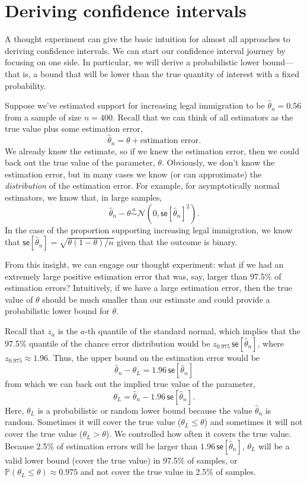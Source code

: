 \documentclass[
  13pt,
  letterpaper,
  DIV=11,
  numbers=noendperiod]{scrreprt}
\newcommand{\N}{\mathcal{N}}
\newcommand{\se}{\textsf{se}}
\renewcommand{\P}{\mathbb{P}}
\theoremstyle{plain}
\theoremstyle{plain}
\theoremstyle{definition}
\theoremstyle{definition}
\theoremstyle{remark}
\begin{document}
\section{Deriving confidence intervals}\label{sec-deriving-cis}

A thought experiment can give the basic intuition for almost all
approaches to deriving confidence intervals. We can start our confidence
interval journey by focusing on one side. In particular, we will derive
a probabilistic lower bound---that is, a bound that will be lower than
the true quantity of interest with a fixed probability.

Suppose we've estimated support for increasing legal immigration to be
\(\widehat{\theta}_n = 0.56\) from a sample of size \(n = 400\). Recall
that we can think of all estimators as the true value plus some
estimation error, \[
\widehat{\theta}_n = \theta + \text{estimation error}.
\] We already know the estimate, so if we knew the estimation error,
then we could back out the true value of the parameter, \(\theta\).
Obviously, we don't know the estimation error, but in many cases we know
(or can approximate) the \emph{distribution} of the estimation error.
For example, for asymptotically normal estimators, we know that, in
large samples, \[
\widehat{\theta}_n - \theta \overset{a}{\sim} \N(0, \se[\widehat{\theta}_n]^2).
\] In the case of the proportion supporting increasing legal
immigration, we know that
\(\se[\widehat{\theta}_n] = \sqrt{\theta(1 - \theta)/n}\) given that the
outcome is binary.

From this insight, we can engage our thought experiment: what if we had
an extremely large positive estimation error that was, say, larger than
97.5\% of estimation errors? Intuitively, if we have a large estimation
error, then the true value of \(\theta\) should be much smaller than our
estimate and could provide a probabilistic lower bound for \(\theta\).

Recall that \(z_a\) is the \(a\)-th quantile of the standard normal,
which implies that the 97.5\% quantile of the chance error distribution
would be \(z_{0.975}\,\se[\widehat{\theta}_n]\), where
\(z_{0.975} \approx 1.96\). Thus, the upper bound on the estimation
error would be \[
\widehat{\theta}_n - \theta_{L} = 1.96\, \se[\widehat{\theta}_n]
\] from which we can back out the implied true value of the parameter,
\[
\theta_{L} = \widehat{\theta}_n - 1.96\, \se[\widehat{\theta}_n].
\] Here, \(\theta_{L}\) is a probabilistic or random lower bound because
the value \(\widehat{\theta}_n\) is random. Sometimes it will cover the
true value (\(\theta_{L} \leq \theta\)) and sometimes it will not cover
the true value (\(\theta_{L} > \theta\)). We controlled how often it
covers the true value. Because 2.5\% of estimation errors will be larger
than \(1.96 \, \se[\widehat{\theta}_n]\), \(\theta_L\) will be a valid
lower bound (cover the true value) in 97.5\% of samples, or
\(\P(\theta_{L} \leq \theta) \approx 0.975\) and not cover the true
value in 2.5\% of samples.
\end{document}
